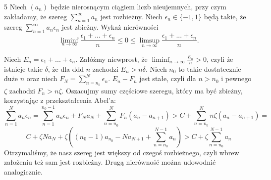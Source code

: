 \documentclass{../note}
\begin{document}
\begin{zadanie}{5}
Niech $(a_{n})$ będzie nierosnącym ciągiem liczb nieujemnych, przy czym zakładamy, że szereg $\sum_{n=1}^{\infty}a_{n}$ jest rozbieżny. Niech $\epsilon_{n}\in\{-1,1\}$ będą takie, że szereg $\sum_{n=1}^{\infty}a_{n}\epsilon_{n}$ jest zbieżny. Wykaż nierówności
$$ \liminf_{n\rightarrow\infty}\frac{\epsilon_{1}+...+\epsilon_{n}}{n}\le0\le \limsup_{n\rightarrow\infty}\frac{\epsilon_{1}+...+\epsilon_{n}}{n}. $$
\end{zadanie}
\begin{rozwiazanie}
Niech $E_n = \epsilon_{1}+...+\epsilon_{n}$. Załóżmy niewprost, że $\liminf_{n\to\infty} \frac{E_n}{n} > 0$, czyli że istnieje takie $\delta$, że dla ddd $n$ zachodzi $E_n > n\delta$. Niech $n_0$ to takie dostatecznie duże $n$ oraz niech $F_N = \sum_{n=n_0}^{N} \epsilon_n$. $E_n - F_n$ jest stałe, czyli dla $n > n_0$ i pewnego $\zeta$ zachodzi $F_n > n\zeta$. Oszacujmy sumy częściowe szeregu, który ma być zbieżny, korzystając z przekształcenia Abel'a:
\[\sum_{n=1}^{N} a_{n}\epsilon_{n} = \sum_{n=1}^{n_0-1} a_{n}\epsilon_n + F_Na_N + \sum_{n=n_0}^{N}F_n(a_n - a_{n+1}) > C + \sum_{n=n_0}^{N}n\zeta(a_n - a_{n+1}) =\]
\[C + \zeta Na_N + \zeta\left((n_0-1)a_{n_0}-Na_{N+1} + \sum_{n=n_0}^{N-1}a_n\right) > C + \zeta\sum_{n=n_0}^{N-1}a_n\]
Otrzymaliśmy, że nasz szereg jest większy od czegoś rozbieżnego, czyli wbrew założeniu też sam jest rozbieżny. Drugą nierówność można udowodnić analogicznie.
\end{rozwiazanie}
\end{document}
